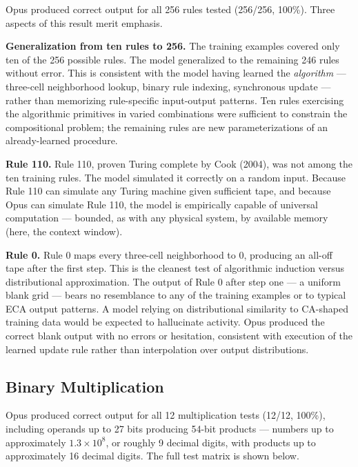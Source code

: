 \documentclass[twocolumn,switch,10pt]{article}
\begin{document}
Opus produced correct output for all 256 rules tested (256/256, 100\%). Three aspects of this result merit emphasis.

\textbf{Generalization from ten rules to 256.} The training examples covered only ten of the 256 possible rules. The model generalized to the remaining 246 rules without error. This is consistent with the model having learned the \emph{algorithm} --- three-cell neighborhood lookup, binary rule indexing, synchronous update --- rather than memorizing rule-specific input-output patterns. Ten rules exercising the algorithmic primitives in varied combinations were sufficient to constrain the compositional problem; the remaining rules are new parameterizations of an already-learned procedure.

\textbf{Rule 110.} Rule 110, proven Turing complete by Cook (2004), was not among the ten training rules. The model simulated it correctly on a random input. Because Rule 110 can simulate any Turing machine given sufficient tape, and because Opus can simulate Rule 110, the model is empirically capable of universal computation --- bounded, as with any physical system, by available memory (here, the context window).

\textbf{Rule 0.} Rule 0 maps every three-cell neighborhood to 0, producing an all-off tape after the first step. This is the cleanest test of algorithmic induction versus distributional approximation. The output of Rule 0 after step one --- a uniform blank grid --- bears no resemblance to any of the training examples or to typical ECA output patterns. A model relying on distributional similarity to CA-shaped training data would be expected to hallucinate activity. Opus produced the correct blank output with no errors or hesitation, consistent with execution of the learned update rule rather than interpolation over output distributions.

\subsection{Binary Multiplication}\label{binary-multiplication}

Opus produced correct output for all 12 multiplication tests (12/12, 100\%), including operands up to 27 bits producing 54-bit products --- numbers up to approximately \(1.3 \times 10^8\), or roughly 9 decimal digits, with products up to approximately 16 decimal digits. The full test matrix is shown below.
\end{document}
